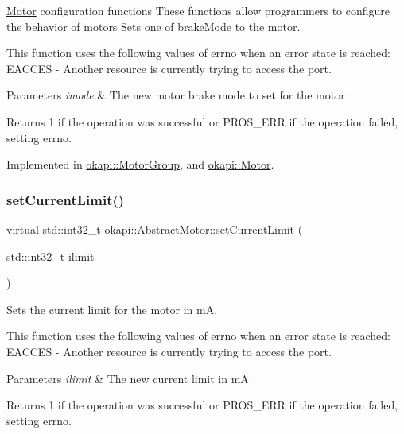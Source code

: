 \mbox{\hyperlink{classokapi_1_1Motor}{Motor}} configuration functions These functions allow programmers to configure the behavior of motors Sets one of brake\+Mode to the motor.

This function uses the following values of errno when an error state is reached\+: E\+A\+C\+C\+ES -\/ Another resource is currently trying to access the port.


\begin{DoxyParams}{Parameters}
{\em imode} & The new motor brake mode to set for the motor \\
\hline
\end{DoxyParams}
\begin{DoxyReturn}{Returns}
1 if the operation was successful or P\+R\+O\+S\+\_\+\+E\+RR if the operation failed, setting errno. 
\end{DoxyReturn}


Implemented in \mbox{\hyperlink{classokapi_1_1MotorGroup_a2124ee76893c401cd6dbf4879808349a}{okapi\+::\+Motor\+Group}}, and \mbox{\hyperlink{classokapi_1_1Motor_a2c40313fa5ff49c25947645885898f91}{okapi\+::\+Motor}}.

\mbox{\label{classokapi_1_1AbstractMotor_aec97c81f3d6604363ebc8ceaf425fe39}} 
\subsubsection{\texorpdfstring{setCurrentLimit()}{setCurrentLimit()}}
{\footnotesize\ttfamily virtual std\+::int32\+\_\+t okapi\+::\+Abstract\+Motor\+::set\+Current\+Limit (\begin{DoxyParamCaption}\item[{std\+::int32\+\_\+t}]{ilimit }\end{DoxyParamCaption})\hspace{0.3cm}{\ttfamily [pure virtual]}}

Sets the current limit for the motor in mA.

This function uses the following values of errno when an error state is reached\+: E\+A\+C\+C\+ES -\/ Another resource is currently trying to access the port.


\begin{DoxyParams}{Parameters}
{\em ilimit} & The new current limit in mA \\
\hline
\end{DoxyParams}
\begin{DoxyReturn}{Returns}
1 if the operation was successful or P\+R\+O\+S\+\_\+\+E\+RR if the operation failed, setting errno. 
\end{DoxyReturn}


